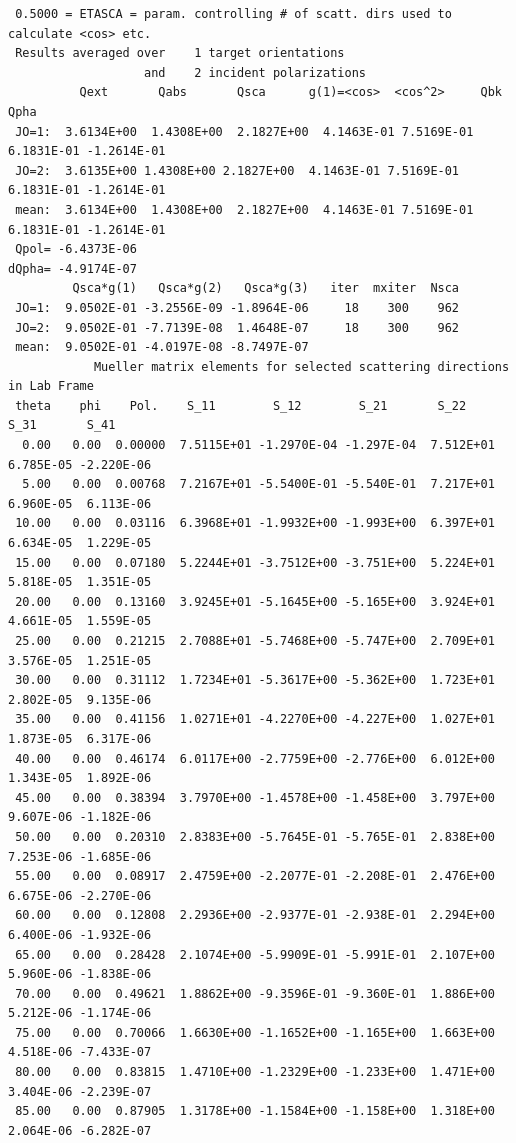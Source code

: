 \begin{appendix}
{\begin{verbatim}
 0.5000 = ETASCA = param. controlling # of scatt. dirs used to calculate <cos> etc.
 Results averaged over    1 target orientations
                   and    2 incident polarizations
          Qext       Qabs       Qsca      g(1)=<cos>  <cos^2>     Qbk       Qpha
 JO=1:  3.6134E+00  1.4308E+00  2.1827E+00  4.1463E-01 7.5169E-01 6.1831E-01 -1.2614E-01
 JO=2:  3.6135E+00 1.4308E+00 2.1827E+00  4.1463E-01 7.5169E-01 6.1831E-01 -1.2614E-01
 mean:  3.6134E+00  1.4308E+00  2.1827E+00  4.1463E-01 7.5169E-01 6.1831E-01 -1.2614E-01
 Qpol= -6.4373E-06                                                  dQpha= -4.9174E-07
         Qsca*g(1)   Qsca*g(2)   Qsca*g(3)   iter  mxiter  Nsca
 JO=1:  9.0502E-01 -3.2556E-09 -1.8964E-06     18    300    962
 JO=2:  9.0502E-01 -7.7139E-08  1.4648E-07     18    300    962
 mean:  9.0502E-01 -4.0197E-08 -8.7497E-07
            Mueller matrix elements for selected scattering directions in Lab Frame   
 theta    phi    Pol.    S_11        S_12        S_21       S_22       S_31       S_41
  0.00   0.00  0.00000  7.5115E+01 -1.2970E-04 -1.297E-04  7.512E+01  6.785E-05 -2.220E-06
  5.00   0.00  0.00768  7.2167E+01 -5.5400E-01 -5.540E-01  7.217E+01  6.960E-05  6.113E-06
 10.00   0.00  0.03116  6.3968E+01 -1.9932E+00 -1.993E+00  6.397E+01  6.634E-05  1.229E-05
 15.00   0.00  0.07180  5.2244E+01 -3.7512E+00 -3.751E+00  5.224E+01  5.818E-05  1.351E-05
 20.00   0.00  0.13160  3.9245E+01 -5.1645E+00 -5.165E+00  3.924E+01  4.661E-05  1.559E-05
 25.00   0.00  0.21215  2.7088E+01 -5.7468E+00 -5.747E+00  2.709E+01  3.576E-05  1.251E-05
 30.00   0.00  0.31112  1.7234E+01 -5.3617E+00 -5.362E+00  1.723E+01  2.802E-05  9.135E-06
 35.00   0.00  0.41156  1.0271E+01 -4.2270E+00 -4.227E+00  1.027E+01  1.873E-05  6.317E-06
 40.00   0.00  0.46174  6.0117E+00 -2.7759E+00 -2.776E+00  6.012E+00  1.343E-05  1.892E-06
 45.00   0.00  0.38394  3.7970E+00 -1.4578E+00 -1.458E+00  3.797E+00  9.607E-06 -1.182E-06
 50.00   0.00  0.20310  2.8383E+00 -5.7645E-01 -5.765E-01  2.838E+00  7.253E-06 -1.685E-06
 55.00   0.00  0.08917  2.4759E+00 -2.2077E-01 -2.208E-01  2.476E+00  6.675E-06 -2.270E-06
 60.00   0.00  0.12808  2.2936E+00 -2.9377E-01 -2.938E-01  2.294E+00  6.400E-06 -1.932E-06
 65.00   0.00  0.28428  2.1074E+00 -5.9909E-01 -5.991E-01  2.107E+00  5.960E-06 -1.838E-06
 70.00   0.00  0.49621  1.8862E+00 -9.3596E-01 -9.360E-01  1.886E+00  5.212E-06 -1.174E-06
 75.00   0.00  0.70066  1.6630E+00 -1.1652E+00 -1.165E+00  1.663E+00  4.518E-06 -7.433E-07
 80.00   0.00  0.83815  1.4710E+00 -1.2329E+00 -1.233E+00  1.471E+00  3.404E-06 -2.239E-07
 85.00   0.00  0.87905  1.3178E+00 -1.1584E+00 -1.158E+00  1.318E+00  2.064E-06 -6.282E-07

\end{verbatim}}
\end{appendix}
